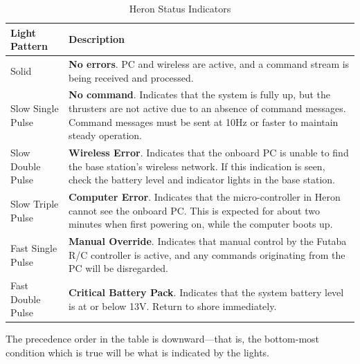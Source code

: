 \documentclass[]{clearpath-latex/clearpath-manual}
\begin{document}
\bgroup
\def\arraystretch{1.5}%
\begin{table}[h]
\centering
\begin{tabular}{m{} p{}}
\rowcolor{lightgrey} 
Light Pattern     & Description                                                                                                                                                                                              \\ \hline
Solid             & \textbf{No errors}. PC and wireless are active, and a command stream is being received and processed.                                                                                                             \\ \hline
Slow Single Pulse & \textbf{No command}. Indicates that the system is fully up, but the thrusters are not active due to an absence of command messages. Command messages must be sent at 10Hz or faster to maintain steady operation. \\ \hline
Slow Double Pulse & \textbf{Wireless Error}. Indicates that the onboard PC is unable to find the base station’s wireless network. If this indication is seen, check the battery level and indicator lights in the base station.       \\ \hline
Slow Triple Pulse & \textbf{Computer Error}. Indicates that the micro-controller in Heron cannot see the onboard PC. This is expected for about two minutes when first powering on, while the computer boots up.                  \\ \hline
Fast Single Pulse & \textbf{Manual Override}. Indicates that manual control by the Futaba R/C controller is active, and any commands originating from the PC will be disregarded.                                                     \\ \hline
Fast Double Pulse & \textbf{Critical Battery Pack}. Indicates that the system battery level is at or below 13V. Return to shore immediately. \\ \hline                                                                                      
\end{tabular}
\newline
\caption{Heron Status Indicators} 
\label{hstatusindicator} 
\end{table}
\egroup

The precedence order in the table is downward—that is, the bottom-most condition which is true will be what is indicated by the lights.

\newpage
\end{document}
